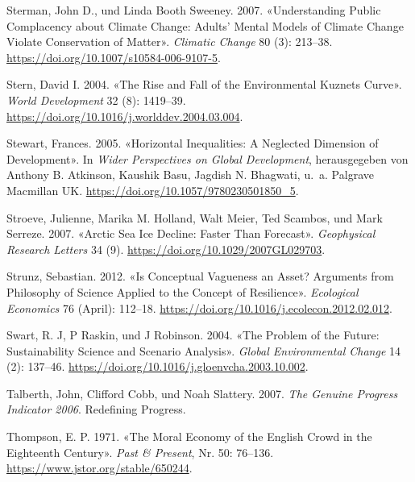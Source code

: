 \documentclass[
  nswissgerman,
  a4paper,
  openany]{book}
\newlength{\cslhangindent}
\newenvironment{CSLReferences}[2] %
 {\begin{list}{}{%
  \setlength{\itemindent}{0pt}
  \setlength{\leftmargin}{0pt}
  \setlength{\parsep}{0pt}
  \ifodd #1
   \setlength{\leftmargin}{\cslhangindent}
   \setlength{\itemindent}{-1\cslhangindent}
  \fi
  \setlength{\itemsep}{#2\baselineskip}}}
 {\end{list}}
\begin{document}
\begin{CSLReferences}{1}{1}
Sterman, John D., und Linda Booth Sweeney. 2007. {«Understanding Public
Complacency about Climate Change: Adults' Mental Models of Climate
Change Violate Conservation of Matter»}. \emph{Climatic Change} 80 (3):
213--38. \url{https://doi.org/10.1007/s10584-006-9107-5}.

Stern, David I. 2004. {«The {Rise} and {Fall} of the {Environmental
Kuznets Curve}»}. \emph{World Development} 32 (8): 1419--39.
\url{https://doi.org/10.1016/j.worlddev.2004.03.004}.

Stewart, Frances. 2005. {«Horizontal {Inequalities}: {A Neglected
Dimension} of {Development}»}. In \emph{Wider {Perspectives} on {Global
Development}}, herausgegeben von Anthony B. Atkinson, Kaushik Basu,
Jagdish N. Bhagwati, u.~a. Palgrave Macmillan UK.
\url{https://doi.org/10.1057/9780230501850_5}.

Stroeve, Julienne, Marika M. Holland, Walt Meier, Ted Scambos, und Mark
Serreze. 2007. {«Arctic Sea Ice Decline: {Faster} Than Forecast»}.
\emph{Geophysical Research Letters} 34 (9).
\url{https://doi.org/10.1029/2007GL029703}.

Strunz, Sebastian. 2012. {«Is Conceptual Vagueness an Asset? {Arguments}
from Philosophy of Science Applied to the Concept of Resilience»}.
\emph{Ecological Economics} 76 (April): 112--18.
\url{https://doi.org/10.1016/j.ecolecon.2012.02.012}.

Swart, R. J, P Raskin, und J Robinson. 2004. {«The Problem of the
Future: Sustainability Science and Scenario Analysis»}. \emph{Global
Environmental Change} 14 (2): 137--46.
\url{https://doi.org/10.1016/j.gloenvcha.2003.10.002}.

Talberth, John, Clifford Cobb, und Noah Slattery. 2007. \emph{The
{Genuine Progress Indicator} 2006}. Redefining Progress.

Thompson, E. P. 1971. {«The {Moral Economy} of the {English Crowd} in
the {Eighteenth Century}»}. \emph{Past \& Present}, Nr. 50: 76--136.
\url{https://www.jstor.org/stable/650244}.


\end{CSLReferences}
\end{document}
